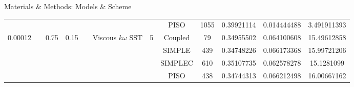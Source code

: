 \documentclass[english,10pt,a4paper,twoside]{beamer}
\begin{document}
\begin{frame}[shrink=55]{Materials \& Methods: Models \& Scheme}
\begin{landscape}
\begin{table}[H]
\begin{tabular}{|cccccccccccc|}
					\multicolumn{1}{|c|}{}                          & \multicolumn{1}{c|}{}                       & \multicolumn{1}{c|}{}                       & \multicolumn{1}{c|}{}                       & \multicolumn{1}{c|}{}                          & \multicolumn{1}{c|}{\cellcolor[HTML]{96FFFB}}                                             & \multicolumn{1}{c|}{}                      & \multicolumn{1}{c|}{\cellcolor[HTML]{F56B00}PISO}    & \multicolumn{1}{c|}{1055}       & \multicolumn{1}{c|}{0.39921114} & \multicolumn{1}{c|}{0.014444488} & \cellcolor[HTML]{34FF34}3.491911393 \\ \cline{8-12} 
					\multicolumn{1}{|c|}{\multirow{-4}{*}{0.00012}} & \multicolumn{1}{c|}{}                       & \multicolumn{1}{c|}{\multirow{-4}{*}{0.75}} & \multicolumn{1}{c|}{\multirow{-4}{*}{0.15}} & \multicolumn{1}{c|}{}                          & \multicolumn{1}{c|}{\multirow{-4}{*}{\cellcolor[HTML]{96FFFB}Viscous $k\omega$ SST}}      & \multicolumn{1}{c|}{\multirow{-4}{*}{5}}   & \multicolumn{1}{c|}{\cellcolor[HTML]{CE6301}Coupled} & \multicolumn{1}{c|}{79}         & \multicolumn{1}{c|}{0.34955502} & \multicolumn{1}{c|}{0.064100608} & 15.49612858                         \\ \cline{1-1} \cline{3-4} \cline{6-12} 
					\multicolumn{1}{|c|}{}                          & \multicolumn{1}{c|}{}                       & \multicolumn{1}{c|}{}                       & \multicolumn{1}{c|}{}                       & \multicolumn{1}{c|}{}                          & \multicolumn{1}{c|}{\cellcolor[HTML]{38FFF8}}                                             & \multicolumn{1}{c|}{}                      & \multicolumn{1}{c|}{\cellcolor[HTML]{FFCE93}SIMPLE}  & \multicolumn{1}{c|}{439}        & \multicolumn{1}{c|}{0.34748226} & \multicolumn{1}{c|}{0.066173368} & 15.99721206                         \\ \cline{8-12} 
					\multicolumn{1}{|c|}{}                          & \multicolumn{1}{c|}{}                       & \multicolumn{1}{c|}{}                       & \multicolumn{1}{c|}{}                       & \multicolumn{1}{c|}{}                          & \multicolumn{1}{c|}{\cellcolor[HTML]{38FFF8}}                                             & \multicolumn{1}{c|}{}                      & \multicolumn{1}{c|}{\cellcolor[HTML]{FE996B}SIMPLEC} & \multicolumn{1}{c|}{610}        & \multicolumn{1}{c|}{0.35107735} & \multicolumn{1}{c|}{0.062578278} & \cellcolor[HTML]{67FD9A}15.1281099  \\ \cline{8-12} 
					\multicolumn{1}{|c|}{}                          & \multicolumn{1}{c|}{}                       & \multicolumn{1}{c|}{}                       & \multicolumn{1}{c|}{}                       & \multicolumn{1}{c|}{}                          & \multicolumn{1}{c|}{\cellcolor[HTML]{38FFF8}}                                             & \multicolumn{1}{c|}{}                      & \multicolumn{1}{c|}{\cellcolor[HTML]{F56B00}PISO}    & \multicolumn{1}{c|}{438}        & \multicolumn{1}{c|}{0.34744313} & \multicolumn{1}{c|}{0.066212498} & 16.00667162                         \\ \cline{8-12} 

\end{tabular}
\end{table}
\end{landscape}
\end{frame}
\end{document}
